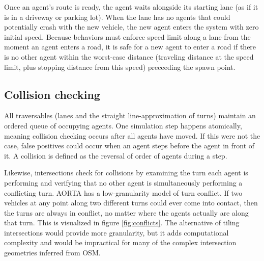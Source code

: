 \documentclass[letterpaper, 10 pt, conference]{ieeeconf}  %
\begin{document}
Once an agent's route is ready, the agent waits alongside its starting lane (as
if it is in a driveway or parking lot). When the lane has no agents that could
potentially crash with the new vehicle, the new agent enters the system with
zero initial speed.  Because behaviors must enforce speed limit along a lane
from the moment an agent enters a road, it is safe for a new agent to enter a
road if there is no other agent within the worst-case distance (traveling
distance at the speed limit, plus stopping distance from this speed) preceeding
the spawn point. %

\subsection{Collision checking}

All traversables (lanes and the straight line-approximation of turns) maintain
an ordered queue of occupying agents.  One simulation step happens atomically,
meaning collision checking occurs after all agents have moved. If this were not
the case, false positives could occur when an agent steps before the agent in front
of it. A collision is defined as the reversal of order of agents during a step. 

Likewise, intersections check for collisions by examining the turn each agent is
performing and verifying that no other agent is simultaneously performing a
conflicting turn. AORTA has a low-granularity model of turn conflict. If two
vehicles at any point along two different turns could ever come into contact,
then the turns are always in conflict, no matter where the agents actually are
along that turn. This is visualized in figure \ref{fig:conflicts}. The
alternative of tiling intersections \cite{JAIR08-dresner} would provide more
granularity, but it adds computational complexity and would be impractical for
many of the complex intersection geometries inferred from OSM.
\end{document}
